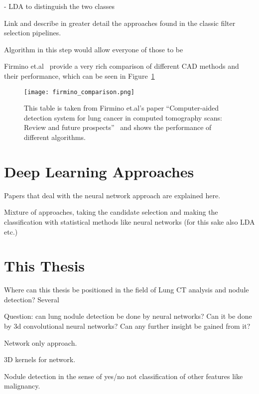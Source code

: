 \documentclass[main.tex]{subfiles}
\begin{document}
- LDA to distinguish the two classes

Link and describe in greater detail the approaches found in the classic filter selection pipelines.

Algorithm in this step would allow everyone of those to be



Firmino et.al~\cite{firmino2014computer} provide a very rich comparison of different CAD methods and their performance, which can be seen in Figure~\ref{fig:firmino_comp}

\begin{figure}[ht]
\centering
\texttt{[image: firmino\_comparison.png]}
\caption{This table is taken from Firmino et.al's paper ``Computer-aided detection system for lung cancer in computed tomography scans: Review and future prospects''~\cite{firmino2014computer} and shows the performance of different algorithms.}
\label{fig:firmino_comp}
\end{figure}

\section{Deep Learning Approaches}
Papers that deal with the neural network approach are explained here.

Mixture of approaches, taking the candidate selection and making the classification with statistical methods like neural networks (for this sake also LDA etc.)

\section{This Thesis}
Where can this thesis be positioned in the field of Lung CT analysis and nodule detection? Several  


Question: can lung nodule detection be done by neural networks? Can it be done by 3d convolutional neural networks? Can any further insight be gained from it?

Network only approach.

3D kernels for network. 

Nodule detection in the sense of yes/no not classification of other features like malignancy.
\end{document}
